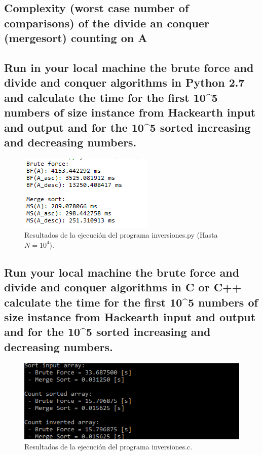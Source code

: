 \documentclass{article}
\begin{document}
\subsection{Complexity (worst case number of comparisons) of the divide an conquer (mergesort) counting on A}


\subsection{Run in your local machine the brute force and divide and conquer algorithms in Python 2.7 and calculate the time for the first 10^5 numbers of size instance from Hackearth input and output and for the 10^5 sorted increasing and decreasing numbers.}

\begin{figure}[H]
  \centering
  \includegraphics[scale=1.0]{./img/inversiones_PY.PNG}
  \caption{Resultados de la ejecución del programa inversiones.py (Hasta $N = 10^4$).}
  \label{fig:inversiones_PY}
\end{figure}

\subsection{Run your local machine the brute force and divide and conquer algorithms in C or C++ calculate the time for the first 10^5 numbers of size instance from Hackearth input and output and for the 10^5 sorted increasing and decreasing numbers.}

\begin{figure}[H]
  \centering
  \includegraphics[scale=1.0]{./img/inversiones_C.PNG}
  \caption{Resultados de la ejecución del programa inversiones.c.}
  \label{fig:inversiones_C}
\end{figure}
\end{document}
